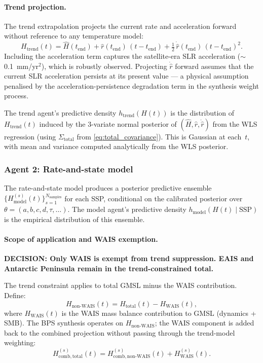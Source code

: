 \documentclass[11pt]{article}
\newcommand{\tend}{t_{\mathrm{end}}}
\begin{document}
\paragraph{Trend projection.}  The trend extrapolation projects the current rate and acceleration forward without reference to any temperature model:
\begin{equation}
  H_{\mathrm{trend}}(t) = \hat{H}(\tend) + \hat{r}(\tend)\,(t - \tend) + \tfrac{1}{2}\,\dot{\hat{r}}(\tend)\,(t - \tend)^2.
  \label{eq:trend_projection}
\end{equation}
Including the acceleration term captures the satellite-era SLR acceleration ($\sim$0.1~mm/yr$^2$), which is robustly observed.  Projecting $\dot{\hat{r}}$ forward assumes that the current SLR acceleration persists at its present value --- a physical assumption penalised by the acceleration-persistence degradation term in the synthesis weight process.

The trend agent's predictive density $h_{\mathrm{trend}}(H(t))$ is the distribution of $H_{\mathrm{trend}}(t)$ induced by the 3-variate normal posterior of $(\hat{H}, \hat{r}, \dot{\hat{r}})$ from the WLS regression (using $\Sigma_{\mathrm{total}}$ from \cref{eq:total_covariance}).  This is Gaussian at each~$t$, with mean and variance computed analytically from the WLS posterior.


\subsubsection{Agent 2: Rate-and-state model}
\label{sec:model_agent}

The rate-and-state model produces a posterior predictive ensemble $\{H_{\mathrm{model}}^{(s)}(t)\}_{s=1}^{N_{\mathrm{samples}}}$ for each SSP, conditional on the calibrated posterior over $\theta = (a, b, c, d, \tau, \ldots)$.  The model agent's predictive density $h_{\mathrm{model}}(H(t) \mid \mathrm{SSP})$ is the empirical distribution of this ensemble.

\paragraph{Scope of application and WAIS exemption.}
\label{sec:ais_decision}
\textbf{DECISION: Only WAIS is exempt from trend suppression.  EAIS and Antarctic Peninsula remain in the trend-constrained total.}

The trend constraint applies to total GMSL minus the WAIS contribution.  Define:
\begin{equation}
  H_{\mathrm{non\text{-}WAIS}}(t) = H_{\mathrm{total}}(t) - H_{\mathrm{WAIS}}(t),
  \label{eq:non_wais}
\end{equation}
where $H_{\mathrm{WAIS}}(t)$ is the WAIS mass balance contribution to GMSL (dynamics + SMB).  The BPS synthesis operates on $H_{\mathrm{non\text{-}WAIS}}$; the WAIS component is added back to the combined projection without passing through the trend-model weighting:
\begin{equation}
  H_{\mathrm{comb,total}}^{(s)}(t) = H_{\mathrm{comb,non\text{-}WAIS}}^{(s)}(t) + H_{\mathrm{WAIS}}^{(s)}(t).
  \label{eq:wais_add_back}
\end{equation}
\end{document}

